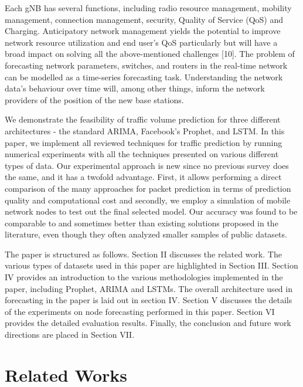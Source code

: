 \documentclass[conference]{IEEEtran}
\begin{document}
Each gNB has several functions, including radio resource management, mobility management, connection management, security, Quality of Service (QoS) and Charging. Anticipatory network management yields the potential to improve network resource utilization and end user’s QoS particularly but will have a broad impact on solving all the above-mentioned challenges [10]. The problem of forecasting network parameters, switches, and routers in the real-time network can be modelled as a time-series forecasting task. Understanding the network data's behaviour over time will, among other things, inform the network providers of the position of the new base stations.

We demonstrate the feasibility of traffic volume prediction for three different architectures - the standard ARIMA, Facebook's Prophet, and LSTM. In this paper, we implement all reviewed techniques for traffic prediction by running numerical experiments with all the techniques presented on various different types of data. Our experimental approach is new since no previous survey does the same, and it has a twofold advantage. First, it allows performing a direct comparison of the many approaches for packet prediction in terms of prediction quality and computational cost and secondly, we employ a simulation of mobile network nodes to test out the final selected model. Our accuracy was found to be comparable to and sometimes better than existing solutions proposed in the literature, even though they often analyzed smaller samples of public datasets.

The paper is structured as follows. Section II discusses the related work. The various types of datasets used in this paper are highlighted in Section III. Section IV provides an introduction to the various methodologies implemented in the paper, including Prophet, ARIMA and LSTMs. The overall architecture used in forecasting in the paper is laid out in section IV. Section V discusses the details of the experiments on node forecasting performed in this paper. Section VI provides the detailed evaluation results. Finally, the conclusion and future work directions are placed in Section VII.

\section{Related Works}
\end{document}
